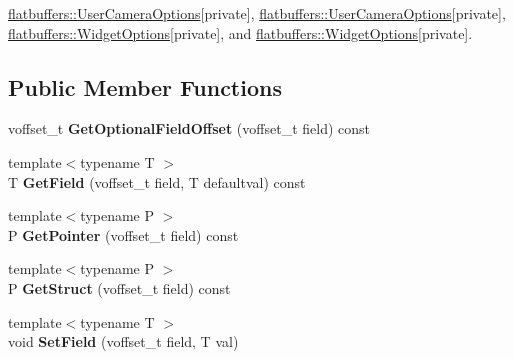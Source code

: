 \hyperlink{structflatbuffers_1_1UserCameraOptions}{flatbuffers\+::\+User\+Camera\+Options}{\ttfamily  \mbox{[}private\mbox{]}}, \hyperlink{structflatbuffers_1_1UserCameraOptions}{flatbuffers\+::\+User\+Camera\+Options}{\ttfamily  \mbox{[}private\mbox{]}}, \hyperlink{structflatbuffers_1_1WidgetOptions}{flatbuffers\+::\+Widget\+Options}{\ttfamily  \mbox{[}private\mbox{]}}, and \hyperlink{structflatbuffers_1_1WidgetOptions}{flatbuffers\+::\+Widget\+Options}{\ttfamily  \mbox{[}private\mbox{]}}.

\subsection*{Public Member Functions}
\begin{DoxyCompactItemize}
\item 
\mbox{\label{classflatbuffers_1_1Table_ab5eb2679e371d9da0ba3172f6d6f4416}} 
voffset\+\_\+t {\bfseries Get\+Optional\+Field\+Offset} (voffset\+\_\+t field) const
\item 
\mbox{\label{classflatbuffers_1_1Table_a70f5dfbdd20de30724a8e05f98741877}} 
{\footnotesize template$<$typename T $>$ }\\T {\bfseries Get\+Field} (voffset\+\_\+t field, T defaultval) const
\item 
\mbox{\label{classflatbuffers_1_1Table_a097d16d7eabd07626936687de1d73f82}} 
{\footnotesize template$<$typename P $>$ }\\P {\bfseries Get\+Pointer} (voffset\+\_\+t field) const
\item 
\mbox{\label{classflatbuffers_1_1Table_a4deb7983161c26792d23ba2a53366701}} 
{\footnotesize template$<$typename P $>$ }\\P {\bfseries Get\+Struct} (voffset\+\_\+t field) const
\item 
\mbox{\label{classflatbuffers_1_1Table_a8c4052c4b37a6cf3d6319b76b70e6637}} 
{\footnotesize template$<$typename T $>$ }\\void {\bfseries Set\+Field} (voffset\+\_\+t field, T val)
\item 
\mbox{\label{classflatbuffers_1_1Table_ae525f2e90e3330066ecf8bb3f98a09fc}} 

\end{DoxyCompactItemize}
